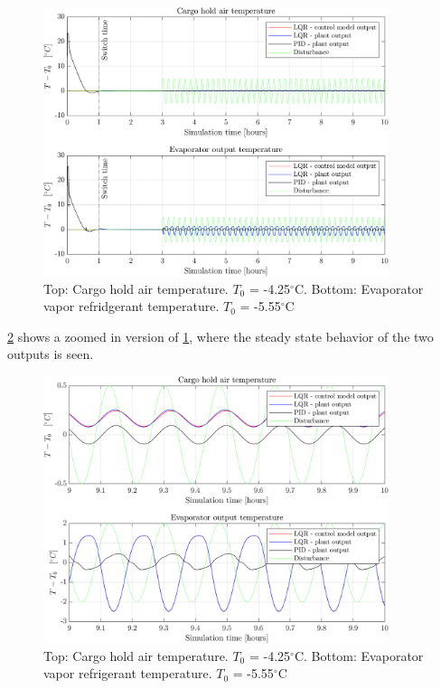 \begin{figure}[h!]
	\centering
	\includegraphics[width=0.9\textwidth]{Graphics/fig_LQRvsKresten_sineDist.png}
	\caption{Top: Cargo hold air temperature. $T_0$ = -4.25$^{\circ}$C. Bottom: Evaporator vapor refridgerant temperature. $T_0$ = -5.55$^{\circ}$C}
	\label{fig:LQR_wellTuned_sineDist}
\end{figure}

\cref{fig:LQR_wellTuned_sineDist_zoom} shows a zoomed in version of \cref{fig:LQR_wellTuned_sineDist}, where the steady state behavior of the two outputs is seen.\\


\begin{figure}[h!]
	\centering
	\includegraphics[width=0.9\textwidth]{Graphics/fig_LQRvsKresten_sineDist_zoom.png}
	\caption{Top: Cargo hold air temperature. $T_0$ = -4.25$^{\circ}$C. Bottom: Evaporator vapor refrigerant temperature. $T_0$ = -5.55$^{\circ}$C}
	\label{fig:LQR_wellTuned_sineDist_zoom}
\end{figure}

